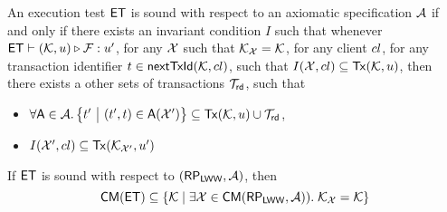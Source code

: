 \begin{definition}
\label{def:main-body-et_sound}
An execution test $\mathsf{ET}$ is sound with respect to an axiomatic 
specification $\mathcal{A}$ if and only if there exists an 
invariant condition $I$ such that whenever $\mathsf{ET} \vdash (\mathcal{K}, u) 
\triangleright \mathcal{F}: u'$, for any $\mathcal{X}$ such that 
$\mathcal{K}_{\mathcal{X}} = \mathcal{K}$, for any client ${cl}$, for any 
transaction identifier $t \in \mathsf{nextTxId}(\mathcal{K}, {cl})$, 
such that  $I(\mathcal{X}, {cl}) \subseteq \mathsf{Tx}(\mathcal{K}, u)$, then  
there exists a other sets of transactions $\mathcal{T}_{\mathsf{rd}}$, 
such that 
\begin{itemize}
\item $\forall \A \in \Ax. \Setcon{\txid' }{ (\txid', \txid) \in \A(\aexec')} \subseteq \Tx(\hh, \vi) \cup \T_{\rd}$, 
\item $I(\mathcal{X}', {cl}) \subseteq \mathsf{Tx}(\mathcal{K}_{\mathcal{X}'}, u')$
\end{itemize}
\end{definition}

\begin{theorem}
\label{thm:main-body-et_soundness}
If $\mathsf{ET}$ is sound with respect to $(\mathsf{RP}_{\mathsf{LWW}}, \mathcal{A})$, then 
\[
    \mathsf{CM}(\mathsf{ET}) \subseteq \{ \mathcal{K} \mid \exists \mathcal{X} \in \mathsf{CM}(\mathsf{RP}_{\mathsf{LWW}}, \mathcal{A})).\;\mathcal{K}_{\mathcal{X}} = \mathcal{K}\}
\]
\end{theorem}

